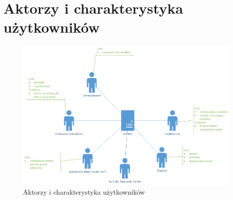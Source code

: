 \section{Aktorzy i charakterystyka użytkowników}
\begin{figure}[h!]
	\centering
	\includegraphics[scale=0.65]{images/Strony_cele.png}
	\caption{Aktorzy i charakterystyka użytkowników}
\end{figure}